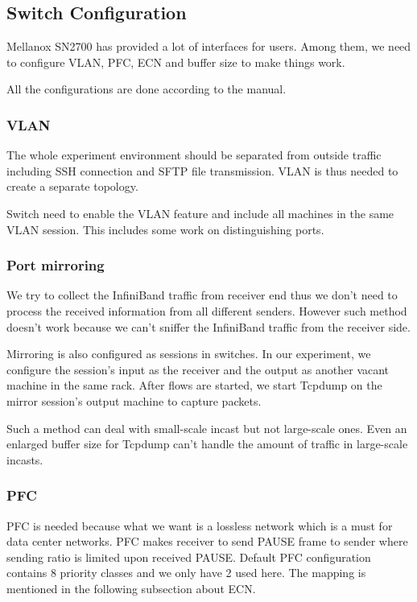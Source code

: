 \documentclass[12pt,a4paper]{article}
\begin{document}
\subsection{Switch Configuration}

Mellanox SN2700 has provided a lot of interfaces for users.
Among them, we need to configure VLAN, PFC, ECN and buffer size to make things work.

All the configurations are done according to the manual.

\subsubsection{VLAN}
The whole experiment environment should be separated from outside traffic including SSH connection and SFTP file transmission.
VLAN is thus needed to create a separate topology.

Switch need to enable the VLAN feature and include all machines in the same VLAN session.
This includes some work on distinguishing ports.

\subsubsection{Port mirroring}

We try to collect the InfiniBand traffic from
receiver end thus we don't need to process the received information from all different senders.
However such method doesn't work because we can't sniffer the InfiniBand traffic from the receiver side.

Mirroring is also configured as sessions in switches.
In our experiment, we configure the session's input as the receiver and the output as another vacant machine in the same rack.
After flows are started, we start Tcpdump on the mirror session's output machine to capture packets.

Such a method can deal with small-scale incast but not large-scale ones.
Even an enlarged buffer size for Tcpdump can't handle the amount of traffic in large-scale incasts.

\subsubsection{PFC}
PFC is needed because what we want is a lossless network which is a must for data center networks.
PFC makes receiver to send PAUSE frame to sender where sending ratio is limited upon received PAUSE.
Default PFC configuration contains 8 priority classes and we only have 2 used here.
The mapping is mentioned in the following subsection about ECN.
\end{document}
